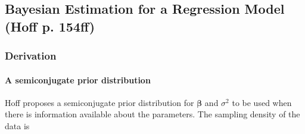 \documentclass[12pt, a4paper]{article}
\begin{document}
%
%
%
%




\clearpage

  \subsection{Bayesian Estimation for a Regression Model (Hoff p. 154ff)}

  \subsubsection{Derivation}

    \paragraph{A semiconjugate prior distribution}\label{normRegSemiconjugatePrior}
    Hoff proposes a semiconjugate prior distribution for $\boldsymbol\beta$ and $\sigma^2$ to be used when there is information available about the parameters.  The sampling density of the data is

\end{document}
